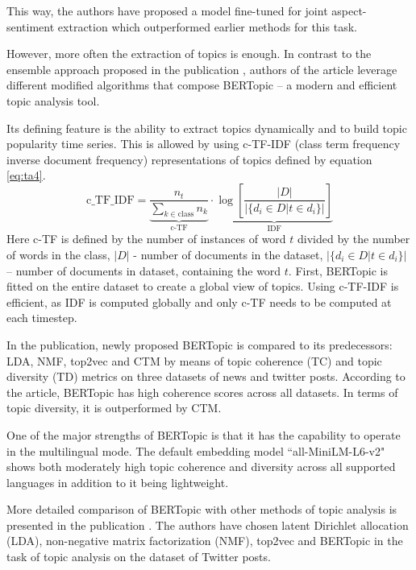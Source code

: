 \documentclass[3p,times,procedia]{elsarticle}
\begin{document}
This way, the authors have proposed a model fine-tuned for joint aspect-sentiment extraction which outperformed earlier methods for this task.

However, more often the extraction of topics is enough. In contrast to the ensemble approach proposed in the publication \cite{onan2019two}, authors of the article \cite{grootendorst2022bertopic} leverage different modified algorithms that compose BERTopic -- a modern and efficient topic analysis tool.

Its defining feature is the ability to extract topics dynamically and to build topic popularity time series. This is allowed by using c-TF-IDF (class term frequency inverse document frequency) representations of topics defined by equation \ref{eq:ta4}.
\begin{equation} \label{eq:ta4}
\mathrm{c\_TF\_IDF} = \underbrace{\frac{n_t}{\sum\limits_{k \in \mathrm{class}} n_k}}_{\textrm{c-TF}} \cdot \underbrace{\log \left[ \frac{|D|}{|\{ d_i \in D | t \in d_i \}|} \right]}_{\mathrm{IDF}}
\end{equation}
Here c-TF is defined by the number of instances of word $t$ divided by the number of words in the class, $|D|$ - number of documents in the dataset, $|\{ d_i \in D | t \in d_i \}|$ -- number of documents in dataset, containing the word $t$. First, BERTopic is fitted on the entire dataset to create a global view of topics. Using c-TF-IDF is efficient, as IDF is computed globally and only c-TF needs to be computed at each timestep.

In the publication, newly proposed BERTopic is compared to its predecessors: LDA, NMF, top2vec and CTM by means of topic coherence (TC) and topic diversity (TD) metrics on three datasets of news and twitter posts. According to the article, BERTopic has high coherence scores across all datasets. In terms of topic diversity, it is outperformed by CTM.

One of the major strengths of BERTopic is that it has the capability to operate in the multilingual mode. The default embedding model ``all-MiniLM-L6-v2" shows both moderately high topic coherence and diversity across all supported languages in addition to it being lightweight.

More detailed comparison of BERTopic with other methods of topic analysis is presented in the publication \cite{egger2022topic}. The authors have chosen latent Dirichlet allocation (LDA), non-negative matrix factorization (NMF), top2vec and BERTopic in the task of topic analysis on the dataset of Twitter posts.
\end{document}

